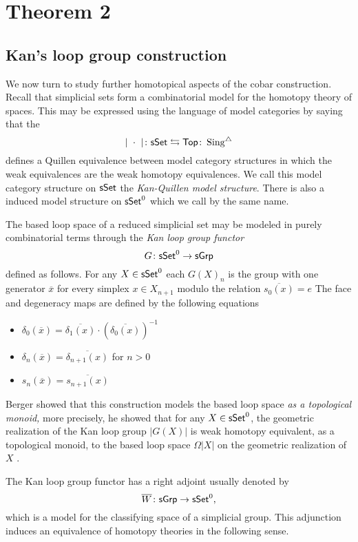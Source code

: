 
\section{Theorem 2}

\subsection{Kan's loop group construction} We now turn to study further homotopical aspects of the cobar construction. Recall that simplicial sets form a combinatorial model for the homotopy theory of spaces. This may be expressed using the language of model categories by saying that the
$$ |\text{ } \cdot \text{ }| \colon \mathsf{sSet} \leftrightarrows \mathsf{Top} \colon \operatorname{Sing^{\triangle}}$$
defines a Quillen equivalence between model category structures in which the weak equivalences are the weak homotopy equivalences. We call this model category structure on $\mathsf{sSet}$ the \textit{Kan-Quillen model structure}. There is also a induced model structure on $\mathsf{sSet}^0$ which we call by the same name. 

The based loop space of a reduced simplicial set may be modeled in purely combinatorial terms through the \textit{Kan loop group functor}  $$G\colon \mathsf{sSet}^0 \to \mathsf{sGrp}$$ defined as follows. For any $X \in \mathsf{sSet}^0$ each $G(X)_n$ is the group with one generator $\overline{x}$ for every simplex $x \in X_{n+1}$ modulo the relation $\overline{s_0(x)}=e$ The face and degeneracy maps are defined by the following equations
\begin{itemize}
    \item $\delta_0(\overline{x}) = \overline{\delta_1(x)} \cdot (\overline{\delta_0(x)})^{-1}$
    \item $\delta_n(\overline{x})= \overline{\delta_{n+1}(x)}$ for $n >0$
    \item $s_n(\overline{x})= \overline{s_{n+1}(x)}$
\end{itemize}


Berger showed that this construction models the based loop space \textit{as a topological monoid,} more precisely, he showed that for any $X \in \mathsf{sSet}^0$, the geometric realization of the Kan loop group $|G(X)|$ is weak homotopy equivalent, as a topological monoid, to the based loop space $\Omega|X|$ on the geometric realization of $X$ \cite{berger1995loops}. 


The Kan loop group functor has a right adjoint usually denoted by 
$$\overline{W} \colon \mathsf{sGrp} \to \mathsf{sSet}^0,$$ which is a model for the classifying space of a simplicial group. This adjunction induces an equivalence of homotopy theories in the following sense.

